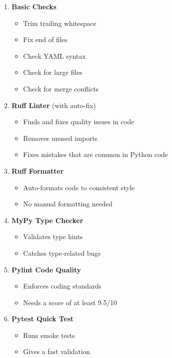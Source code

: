 \begin{enumerate}
\def\labelenumi{\arabic{enumi}.}
\item
  \textbf{Basic Checks}

  \begin{itemize}
  \tightlist
  \item
    Trim trailing whitespace
  \item
    Fix end of files
  \item
    Check YAML syntax
  \item
    Check for large files
  \item
    Check for merge conflicts
  \end{itemize}
\item
  \textbf{Ruff Linter} (with auto-fix)

  \begin{itemize}
  \tightlist
  \item
    Finds and fixes quality issues in code
  \item
    Removes unused imports
  \item
    Fixes mistakes that are common in Python code
  \end{itemize}
\item
  \textbf{Ruff Formatter}

  \begin{itemize}
  \tightlist
  \item
    Auto-formats code to consistent style
  \item
    No manual formatting needed
  \end{itemize}
\item
  \textbf{MyPy Type Checker}

  \begin{itemize}
  \tightlist
  \item
    Validates type hints
  \item
    Catches type-related bugs
  \end{itemize}
\item
  \textbf{Pylint Code Quality}

  \begin{itemize}
  \tightlist
  \item
    Enforces coding standards
  \item
    Needs a score of at least 9.5/10
  \end{itemize}
\item
  \textbf{Pytest Quick Test}

  \begin{itemize}
  \tightlist
  \item
    Runs smoke tests
  \item
    Gives a fast validation
  \end{itemize}
\end{enumerate}


